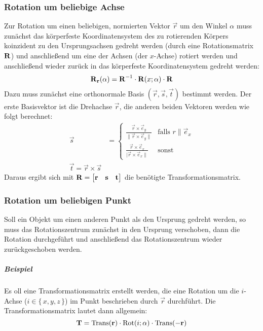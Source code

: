 			\subsubsection{Rotation um beliebige Achse}
				Zur Rotation um einen beliebigen, normierten Vektor \( \vec{r} \) um den Winkel \(\alpha\) muss zunächst das körperfeste Koordinatensystem des zu rotierenden Körpers koinzident zu den Ursprungsachsen gedreht werden (durch eine Rotationsmatrix \( \boldsymbol{\mathrm{R}} \)) und anschließend um eine der Achsen (\zB der \(x\)-Achse) rotiert werden und anschließend wieder zurück in das körperfeste Koordinatensystem gedreht werden:
				\begin{equation*}
					\boldsymbol{\mathrm{R}}_{\boldsymbol{\mathrm{r}}}(\alpha) = \boldsymbol{\mathrm{R}}^{-1} \cdot \boldsymbol{\mathrm{R}}(x; \alpha) \cdot \boldsymbol{\mathrm{R}}
				\end{equation*}
				Dazu muss zunächst eine orthonormale Basis \( (\vec{r}, \vec{s}, \vec{t}) \) bestimmt werden. Der erste Basisvektor ist die Drehachse \(\vec{r}\), die anderen beiden Vektoren werden wie folgt berechnet:
				\begin{align*}
					\vec{s} &=
						\begin{cases}
							\frac{\vec{r} \times \vec{e}_y}{\lVert \vec{r} \times \vec{e}_y \rVert} & \text{falls } r \parallel \vec{e}_x \\
							\frac{\vec{r} \times \vec{e}_x}{\lvert \vec{r} \times \vec{e}_x \rVert} & \text{sonst}
						\end{cases} \\
					\vec{t} = \vec{r} \times \vec{s}
				\end{align*}
				Daraus ergibt sich mit \( \boldsymbol{\mathrm{R}} = \begin{bmatrix} \boldsymbol{\mathrm{r}} & \boldsymbol{\mathrm{s}} & \boldsymbol{\mathrm{t}} \end{bmatrix} \) die benötigte Transformationsmatrix.

			\subsubsection{Rotation um beliebigen Punkt}
				Soll ein Objekt um einen anderen Punkt als den Ursprung gedreht werden, so muss das Rotationszentrum zunächst in den Ursprung verschoben, dann die Rotation durchgeführt und anschließend das Rotationszentrum wieder zurückgeschoben werden.
				
				\subparagraph{Beispiel}
				Es oll eine Transformationsmatrix erstellt werden, die eine Rotation um die \(i\)-Achse (\( i \in \{\, x, y, z \,\} \)) im Punkt beschrieben durch \( \vec{r} \) durchführt. Die Transformationsmatrix lautet dann allgemein:
				\begin{equation*}
					\boldsymbol{\mathrm{T}} = \text{Trans}(\boldsymbol{\mathrm{r}}) \cdot \text{Rot}(i; \alpha) \cdot \text{Trans}(-\boldsymbol{\mathrm{r}})
				\end{equation*}

